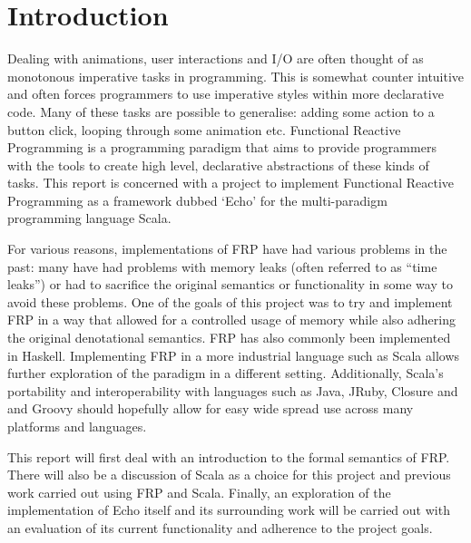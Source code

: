 \chapter{Introduction}

  Dealing with animations, user interactions and I/O are often thought of as monotonous imperative tasks
  in programming. This is somewhat counter intuitive and often forces programmers to use imperative
  styles within more declarative code. Many of these tasks are possible to generalise: adding
  some action to a button click, looping through some animation etc. Functional Reactive Programming
  is a programming paradigm that aims to provide programmers with the tools to create high level,
  declarative abstractions of these kinds of tasks. This report is concerned with a project to
  implement Functional Reactive Programming as a framework dubbed `Echo' \cite{Stott} for the multi-paradigm programming language
  Scala.

  For various reasons, implementations of FRP have had various problems in the past: many have had problems
  with memory leaks (often referred to as ``time leaks'') or had to sacrifice the original semantics or functionality in some way to avoid these problems. One of the goals
  of this project was to try and implement FRP in a way that allowed for a controlled usage of memory while also
  adhering the original denotational semantics. FRP
  has also commonly been implemented in Haskell. Implementing FRP in a more industrial language such as Scala allows
  further exploration of the paradigm in a different setting. Additionally, Scala's portability and interoperability with
  languages such as Java, JRuby, Closure and and Groovy should hopefully allow for easy wide spread use across many platforms and languages. 

  This report will first deal with an introduction to the formal semantics of FRP. There will also be a discussion of Scala as a 
  choice for this project and previous work carried out using FRP and Scala.
  Finally, an exploration of the implementation of Echo itself and its surrounding work will be carried out with an
  evaluation of its current functionality and adherence to the project goals.
